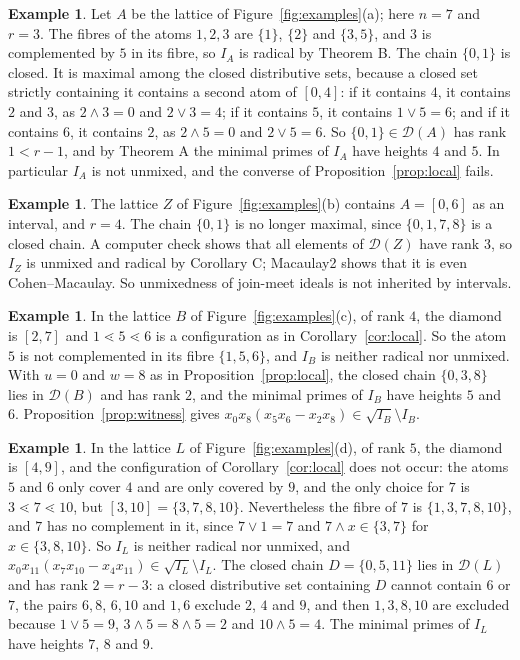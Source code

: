 \documentclass{amsart}
\theoremstyle{definition}
\newtheorem{example}[theorem]{Example}
\newcommand{\cD}{\mathcal D}
\begin{document}
\begin{example}\label{ex:A}
Let $A$ be the lattice of Figure~\ref{fig:examples}(a); here $n=7$ and $r=3$. The fibres of the atoms $1,2,3$ are $\{1\}$, $\{2\}$ and $\{3,5\}$, and $3$ is complemented by $5$ in its fibre, so $I_A$ is radical by Theorem B. The chain $\{0,1\}$ is closed. It is maximal among the closed distributive sets, because a closed set strictly containing it contains a second atom of $[0,4]$: if it contains $4$, it contains $2$ and $3$, as $2\wedge3=0$ and $2\vee3=4$; if it contains $5$, it contains $1\vee5=6$; and if it contains $6$, it contains $2$, as $2\wedge5=0$ and $2\vee5=6$. So $\{0,1\}\in\cD(A)$ has rank $1<r-1$, and by Theorem A the minimal primes of $I_A$ have heights $4$ and $5$. In particular $I_A$ is not unmixed, and the converse of Proposition~\ref{prop:local} fails.
\end{example}

\begin{example}\label{ex:Z}
The lattice $Z$ of Figure~\ref{fig:examples}(b) contains $A=[0,6]$ as an interval, and $r=4$. The chain $\{0,1\}$ is no longer maximal, since $\{0,1,7,8\}$ is a closed chain. A computer check shows that all elements of $\cD(Z)$ have rank $3$, so $I_Z$ is unmixed and radical by Corollary C; Macaulay2 \cite{M2} shows that it is even Cohen--Macaulay. So unmixedness of join-meet ideals is not inherited by intervals.
\end{example}

\begin{example}\label{ex:B}
In the lattice $B$ of Figure~\ref{fig:examples}(c), of rank $4$, the diamond is $[2,7]$ and $1\lessdot5\lessdot6$ is a configuration as in Corollary~\ref{cor:local}. So the atom $5$ is not complemented in its fibre $\{1,5,6\}$, and $I_B$ is neither radical nor unmixed. With $u=0$ and $w=8$ as in Proposition~\ref{prop:local}, the closed chain $\{0,3,8\}$ lies in $\cD(B)$ and has rank $2$, and the minimal primes of $I_B$ have heights $5$ and $6$. Proposition~\ref{prop:witness} gives $x_0x_8(x_5x_6-x_2x_8)\in\sqrt{I_B}\setminus I_B$.
\end{example}

\begin{example}\label{ex:L12}
In the lattice $L$ of Figure~\ref{fig:examples}(d), of rank $5$, the diamond is $[4,9]$, and the configuration of Corollary~\ref{cor:local} does not occur: the atoms $5$ and $6$ only cover $4$ and are only covered by $9$, and the only choice for $7$ is $3\lessdot7\lessdot10$, but $[3,10]=\{3,7,8,10\}$. Nevertheless the fibre of $7$ is $\{1,3,7,8,10\}$, and $7$ has no complement in it, since $7\vee1=7$ and $7\wedge x\in\{3,7\}$ for $x\in\{3,8,10\}$. So $I_L$ is neither radical nor unmixed, and $x_0x_{11}(x_7x_{10}-x_4x_{11})\in\sqrt{I_L}\setminus I_L$. The closed chain $D=\{0,5,11\}$ lies in $\cD(L)$ and has rank $2=r-3$: a closed distributive set containing $D$ cannot contain $6$ or $7$, the pairs $6,8$, $6,10$ and $1,6$ exclude $2$, $4$ and $9$, and then $1,3,8,10$ are excluded because $1\vee5=9$, $3\wedge5=8\wedge5=2$ and $10\wedge5=4$. The minimal primes of $I_L$ have heights $7$, $8$ and $9$.
\end{example}
\end{document}

